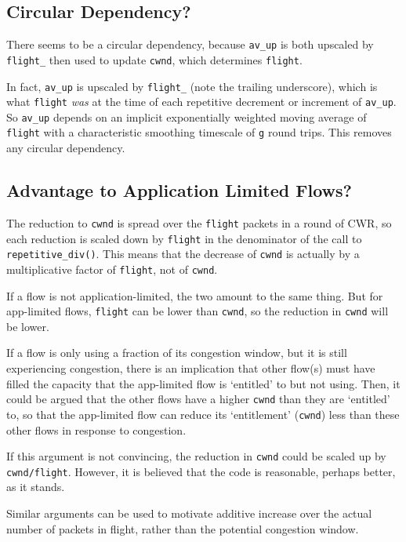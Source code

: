 \subsection{Circular Dependency?}\label{prresp_No_Circular_Dependency}

There seems to be a circular dependency, because \texttt{av\_up} is both upscaled by \texttt{flight\_} then used to update \texttt{cwnd}, which determines \texttt{flight}.

In fact, \texttt{av\_up} is upscaled by \texttt{flight\_} (note the trailing underscore), which is what \texttt{flight} \emph{was} at the time of each repetitive decrement or increment of \texttt{av\_up}. So \texttt{av\_up} depends on an implicit exponentially weighted moving average of \texttt{flight} with a characteristic smoothing timescale of \texttt{g} round trips. This removes any circular dependency.

\subsection{Advantage to Application Limited Flows?}\label{prresp_Advantage_App-Limited}

The reduction to \texttt{cwnd} is spread over the \texttt{flight} packets in a round of CWR, so each reduction is scaled down by \texttt{flight} in the denominator of the call to \texttt{repetitive\_div()}. This means that the decrease of \texttt{cwnd} is actually by a multiplicative factor of \texttt{flight}, not of \texttt{cwnd}.

If a flow is not application-limited, the two amount to the same thing. But for app-limited flows, \texttt{flight} can be lower than \texttt{cwnd}, so the reduction in \texttt{cwnd} will be lower.

If a flow is only using a fraction of its congestion window, but it is still experiencing congestion, there is an implication that other flow(s) must have filled the capacity that the app-limited flow is `entitled' to but not using. Then, it could be argued that the other flows have a higher \texttt{cwnd} than they are `entitled' to, so that the app-limited flow can reduce its `entitlement' (\texttt{cwnd}) less than these other flows in response to congestion.

If this argument is not convincing, the reduction in \texttt{cwnd} could be scaled up by \texttt{cwnd/flight}. However, it is believed that the code is reasonable, perhaps better, as it stands.

Similar arguments can be used to motivate additive increase over the actual number of packets in flight, rather than the potential congestion window.

